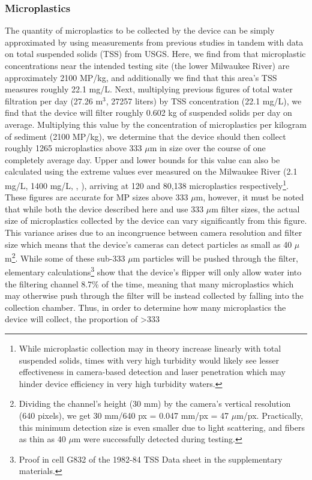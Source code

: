 \documentclass[fleqn,10pt]{SelfArx} %
\begin{document}
	\subsubsection{Microplastics}
	The quantity of microplastics to be collected by the device can be simply approximated by using measurements from previous studies in tandem with data on total suspended solids (TSS) from USGS. Here, we find from \cite{LenakerEtAlvertdist} that microplastic concentrations near the intended testing site (the lower Milwaukee River) are approximately 2100 MP/kg, and additionally we find that this area's TSS measures roughly 22.1 mg/L. Next, multiplying previous figures of total water filtration per day (27.26 m$^3$, 27257 liters) by TSS concentration (22.1 mg/L), we find that the device will filter roughly 0.602 kg of suspended solids per day on average. Multiplying this value by the concentration of microplastics per kilogram of sediment (2100 MP/kg), we determine that the device should then collect roughly 1265 microplastics above 333 $\mu$m in size over the course of one completely average day. Upper and lower bounds for this value can also be calculated using the extreme values ever measured on the Milwaukee River (2.1 mg/L, 1400 mg/L, \cite{USGSMil}, \cite{MKETSS}), arriving at 120 and 80,138 microplastics respectively\footnote{While microplastic collection may in theory increase linearly with total suspended solids, times with very high turbidity would likely see lesser effectiveness in camera-based detection and laser penetration which may hinder device efficiency in very high turbidity waters.}. These figures are accurate for MP sizes above 333 $\mu$m, however, it must be noted that while both the device described here and \cite{LenakerEtAlvertdist} use 333 $\mu$m filter sizes, the actual size of microplastics collected by the device can vary significantly from this figure. This variance arises due to an incongruence between camera resolution and filter size which means that the device's cameras can detect particles as small as 40 $\mu$m\footnote{Dividing the channel's height (30 mm) by the camera's vertical resolution (640 pixels), we get 30 mm/640 px = 0.047 mm/px = 47 $\mu$m/px. Practically, this minimum detection size is even smaller due to light scattering, and fibers as thin as 40 $\mu$m were successfully detected during testing.}. While some of these sub-333 $\mu$m particles will be pushed through the filter, elementary calculations\footnote{Proof in cell G832 of the 1982-84 TSS Data sheet in the supplementary materials.} show that the device's flipper will only allow water into the filtering channel 8.7\% of the time, meaning that many microplastics which may otherwise push through the filter will be instead collected by falling into the collection chamber. Thus, in order to determine how many microplastics the device will collect, the proportion of \textgreater 333 
\end{document}
